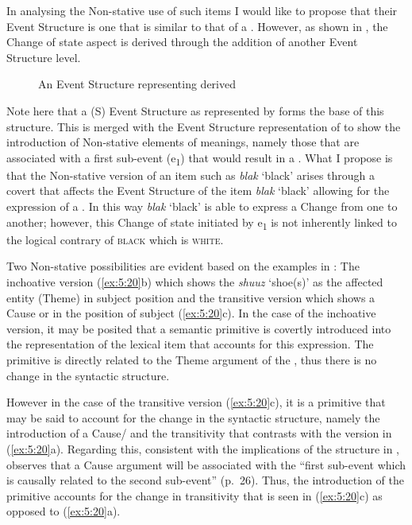 In analysing the Non-stative use of such items I would like to propose that their Event Structure is one that is similar to that of a . However, as shown in , the Change of state aspect is derived through the addition of another Event Structure level.

\begin{figure}
\caption{An Event Structure representing derived \label{ex:5:24}}
\end{figure}

Note here that a  (S) Event Structure as represented by \citet{Pustejovsky1991} forms the base of this structure. This is merged with the Event Structure representation of  to show the introduction of Non-stative elements of meanings, namely those that are associated with a first sub-event (e\textsubscript{1}) that would result in a . What I propose is that the Non-stative version of an item such as \textit{blak} `black' arises through a covert  that affects the Event Structure of the  item \textit{blak} `black' allowing for the expression of a . In this way \textit{blak} `black' is able to express a Change from one  to another; however, this Change of state initiated by e\textsubscript{1} is not inherently linked to the logical contrary of \textsc{black} which is \textsc{white}. 

Two Non-stative possibilities are evident based on the examples in : The inchoative version (\ref{ex:5:20}b) which shows the \textit{shuuz}  `shoe(s)’ as the affected entity (Theme) in subject position and the transitive version which shows a Cause or  in the position of subject (\ref{ex:5:20}c). In the case of the inchoative version, it may be posited that a semantic primitive \BECOME is covertly introduced into the representation of the lexical item that accounts for this expression. The primitive \BECOME is directly related to the Theme argument of the , thus there is no change in the syntactic structure. 

However in the case of the transitive version (\ref{ex:5:20}c), it is a \CAUSE primitive that may be said to account for the change in the syntactic structure, namely the introduction of a Cause\slash {} and the transitivity that contrasts with the  version in (\ref{ex:5:20}a). Regarding this, consistent with the implications of the structure in , \citet{Grimshaw1990} observes that a Cause argument will be associated with the ``first sub-event which is causally related to the second sub-event'' (p.~26). Thus, the introduction of the primitive \CAUSE accounts for the change in transitivity that is seen in (\ref{ex:5:20}c) as opposed to (\ref{ex:5:20}a).

